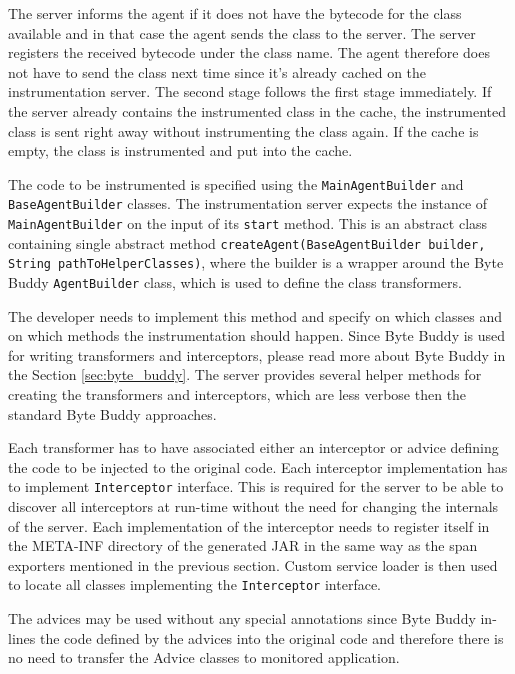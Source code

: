 The server informs the agent if it does not have the bytecode for the class available and in that case  the agent sends the class to the server. The server registers the received bytecode under the class name. The agent therefore does not have to send the class next time since it's already cached on the instrumentation server.
The second stage follows the first stage immediately. If the server already contains the instrumented class in the cache, the instrumented class is sent right away without instrumenting the class again. If the cache is empty, the class is instrumented and put into the cache.

The code to be  instrumented is specified using the \texttt{MainAgentBuilder} and \texttt{BaseAgentBuilder} classes.
The instrumentation server expects the instance of \texttt{MainAgentBuilder} on the input of its \texttt{start} method. This is an abstract class containing single abstract method \texttt{createAgent(BaseAgentBuilder builder, String pathToHelperClasses)}, where the builder is a wrapper around the Byte Buddy \texttt{AgentBuilder} class, which is used to define the class transformers.

The developer needs to implement this method and specify on which classes and on which methods the instrumentation should happen. Since Byte Buddy is used for writing transformers and interceptors, please read more about Byte Buddy in the Section \ref{sec:byte_buddy}. The server provides several helper methods for creating the transformers and interceptors, which are less verbose then the standard Byte Buddy approaches.

Each transformer has to have associated either an interceptor or advice defining the code to be injected to the original code. Each interceptor implementation has to implement \texttt{Interceptor} interface. This is required for the server to be able to discover all interceptors at run-time without the need for changing the internals of the server. Each implementation of the interceptor needs to register itself in the META-INF directory of the generated JAR in the same way as the span exporters mentioned in the previous section. Custom service loader is then used to locate all classes implementing the \texttt{Interceptor} interface. 

The advices may be used without any special annotations since Byte Buddy in-lines the code defined by the advices into the original code and therefore there is no need to transfer the Advice classes to monitored application.

